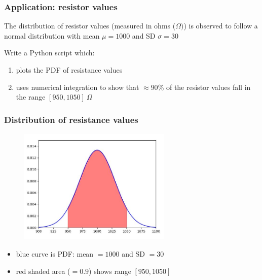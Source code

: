 \documentclass[english,14pt]{beamer}
\begin{document}

\begin{frame}[fragile]

\frametitle{Application: resistor values}

The distribution of resistor values (measured in ohms ($\Omega)$) is observed to follow a normal distribution with mean $\mu=1000$ and SD $\sigma = 30$

\vspace*{5mm}

Write a Python script which:
\begin{enumerate}
	\item plots the PDF of resistance values
	\item uses numerical integration to show that $\approx90$\% of the resistor values fall in the range $[950,1050]~\Omega$
\end{enumerate}

\end{frame}


\begin{frame}[fragile]

\frametitle{Distribution of resistance values}

\begin{figure}[ht]
	\centering
	\includegraphics[width=0.65\textwidth]{figures/resistanceoutput}
\end{figure}

\vspace*{-5mm}

\begin{itemize}
	\item blue curve is PDF: mean $=1000$ and SD $=30$
	\item red shaded area ($= 0.9$) shows range $[950,1050]$
\end{itemize}

\end{frame}
\end{document}
